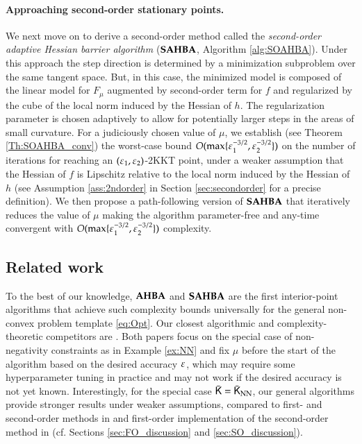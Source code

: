 \paragraph{Approaching second-order stationary points.}
We next move on to derive a second-order method called the \emph{second-order adaptive Hessian barrier algorithm} ($\operatorname{\mathbf{SAHBA}}$, Algorithm \ref{alg:SOAHBA}). Under this approach the step direction is determined by a minimization subproblem over the same tangent space. 
But, in this case, the minimized model is composed of the linear model for $F_{\mu}$ augmented by second-order term for $f$ and regularized by the cube of the local norm induced by the Hessian of $h$. 
The regularization parameter is chosen adaptively to allow for potentially larger steps in the areas of small curvature.
For a judiciously chosen value of $\mu$, we establish (see Theorem \ref{Th:SOAHBA_conv}) the worst-case bound $O(\max\{\varepsilon_1^{-3/2},\varepsilon_2^{-3/2}\})$ on the number of iterations for reaching an $(\varepsilon_1,\varepsilon_2)$-2KKT point, under a weaker assumption that the Hessian of $f$ is Lipschitz relative to the local norm induced by the Hessian of $h$ (see Assumption \ref{ass:2ndorder} in Section \ref{sec:secondorder} for a precise definition). We then propose a path-following version of $\operatorname{\mathbf{SAHBA}}$ that iteratively reduces the value of $\mu$ making the algorithm parameter-free and any-time convergent with $O(\max\{\varepsilon_1^{-3/2},\varepsilon_2^{-3/2}\})$ complexity.

\subsection{Related work}
\label{sec:related}
To the best of our knowledge, $\operatorname{\mathbf{AHBA}}$ and $\operatorname{\mathbf{SAHBA}}$ are the first interior-point algorithms that achieve such complexity bounds universally for the general non-convex problem template \eqref{eq:Opt}. Our closest algorithmic and complexity-theoretic competitors are \cite{HaeLiuYe18,NeiWr20}. Both papers focus on the special case of non-negativity constraints as in Example \ref{ex:NN} and fix $\mu$ before the start of the algorithm based on the desired accuracy $\varepsilon$, which may require some hyperparameter tuning in practice and may not work if the desired accuracy is not yet known. Interestingly, for the special case $\bar{\mathsf{K}}=\bar{\mathsf{K}}_{\text{NN}}$, our general algorithms provide stronger results under weaker assumptions, compared to first- and second-order methods in \cite{HaeLiuYe18} and first-order implementation of the second-order method in \cite{NeiWr20} (cf. Sections \ref{sec:FO_discussion} and \ref{sec:SO_discussion}).%
